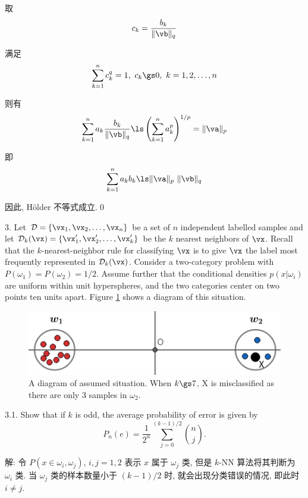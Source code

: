 \documentclass[openany]{ctexbook}
\theoremstyle{kaiti}
\theoremstyle{normal}
\begin{document}
取
\begin{equation}
  c_k=\frac{b_k}{\|\vb\|_q}
\end{equation}

满足
\begin{equation}
  \sum_{k=1}^nc_k^q=1,~c_k\gs0,~k=1,2,\dots,n
\end{equation}

则有
\begin{equation}
  \sum_{k=1}^na_k\frac{b_k}{\|\vb\|_q}\ls\left(\sum_{k=1}^na_k^p\right)^{1/p}=\|\va\|_p
\end{equation}

即
\begin{equation}
  \sum_{k=1}^na_kb_k\ls\|\va\|_p~\|\vb\|_q
\end{equation}

因此, H{\"o}lder 不等式成立.\qed

3. Let $\mathcal{D}=\{\vx_1,\vx_2,\dots,\vx_n\}$ be a set of $n$ independent labelled samples and let $\mathcal{D}_k(\vx)=\{\vx'_1,\vx'_2,\dots,\vx'_k\}$ be the $k$ nearest neighbors of $\vx$. Recall that the $k$-nearest-neighbor rule for classifying $\vx$ is to give $\vx$ the label most frequently represented in $\mathcal{D}_k(\vx)$. Consider a two-category problem with $P(\omega_1) = P(\omega_2) = 1/2$. Assume further that the conditional densities $p(x|\omega_i)$ are uniform within unit hyperspheres, and the two categories center on two points ten units apart. Figure \ref{pic2} shows a diagram of this situation.
\begin{figure}[ht]
	\centering
	\includegraphics[scale=0.5]{diagram.png}
	\caption{A diagram of assumed situation. When $k\gs7$, X is misclassified as there are only $3$ samples in $\omega_2$.}
	\label{pic2}
\end{figure}

3.1. Show that if $k$ is odd, the average probability of error is given by
\begin{equation}\nonumber
    P_n(e)=\frac{1}{2^n}\sum_{j=0}^{(k-1)/2}\binom{n}{j}.
\end{equation}

解: 令 $P(x\in\omega_i,\omega_j)$, $i,j=1,2$ 表示 $x$ 属于 $\omega_j$ 类, 但是 $k$-NN 算法将其判断为 $\omega_i$ 类. 当 $\omega_j$ 类的样本数量小于 $(k-1)/2$ 时, 就会出现分类错误的情况, 即此时 $i\neq j$.
\end{document}

